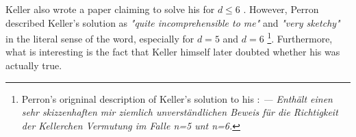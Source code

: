 \documentclass[../thesis.tex]{subfiles}
\begin{document}
\begin{remark}
    Keller also wrote a paper claiming to solve his  for $d\leq 6$ \cite{Keller1937}. However, Perron described Keller's solution as \emph{"quite incomprehensible to me"} and \emph{"very sketchy"} in the literal sense of the word, especially for $d=5$ and $d=6$ \cite{perronUeberLueckenloseAusfuellung1940} \footnote[1]{Perron's origninal description of Keller's solution to his : \emph{— Enthält einen sehr skizzenhaften mir ziemlich unverständlichen Beweis für die Richtigkeit der Kellerchen Vermutung im Falle n=5 unt n=6.}}. Furthermore, what is interesting is the fact that Keller himself later doubted whether his  was actually true.
\end{remark}
\end{document}
